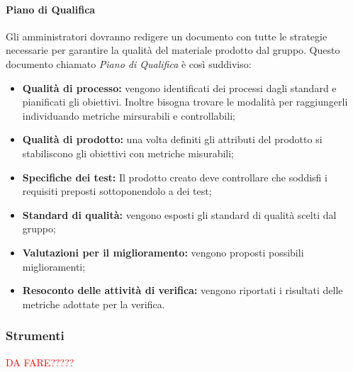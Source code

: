 \paragraph{Piano di Qualifica} Gli amministratori dovranno redigere un documento con tutte le strategie necessarie per garantire la qualità del materiale prodotto dal gruppo. Questo documento chiamato \textit{Piano di Qualifica} è così suddiviso:
\begin{itemize}
    \item \textbf{Qualità di processo:} vengono identificati dei processi dagli standard e pianificati gli obiettivi. Inoltre bisogna trovare le modalità per raggiungerli individuando metriche mirsurabili e controllabili;
    
    \item \textbf{Qualità di prodotto:} una volta definiti gli attributi del prodotto si stabiliscono gli obiettivi con metriche misurabili;
    
    \item \textbf{Specifiche dei test:} Il prodotto creato deve controllare che soddisfi i requisiti preposti sottoponendolo a dei test;
    
    \item \textbf{Standard di qualità:} vengono esposti gli standard di qualità scelti dal gruppo;
    
    \item \textbf{Valutazioni per il miglioramento:} vengono proposti possibili miglioramenti;
    
    \item \textbf{Resoconto delle attività di verifica:} vengono riportati i risultati delle metriche adottate per la verifica.
\end{itemize}

\subsubsection{Strumenti}
\textcolor{red}{DA FARE?????}

